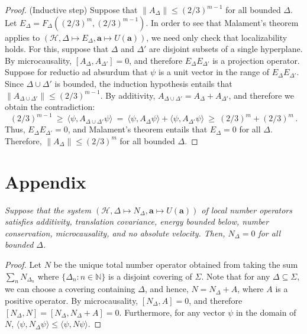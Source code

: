 \documentclass[11pt]{article}
\theoremstyle{remark}
\newcommand{\norm}[1]{\mbox{$\| #1\|$}}
\newcommand{\hil}[1]{\mathcal{#1}}
\begin{document}
\begin{appendix}
\begin{proof}
  (Inductive step) Suppose that $\norm{A_{\Delta}}\leq (2/3)^{m-1}$
  for all bounded $\Delta$.  Let $E_{\Delta}=F_{\Delta} (
  (2/3)^{m},(2/3)^{m-1})$.  In order to see that Malament's theorem
  applies to $(\hil{H},\Delta \mapsto E_{\Delta},\mathbf{a}\mapsto
  U(\mathbf{a}))$, we need only check that localizability holds.  For
  this, suppose that $\Delta$ and $\Delta '$ are disjoint subsets of a
  single hyperplane.  By microcausality, $[A_{\Delta},A_{\Delta
    '}]=0$, and therefore $E_{\Delta}E_{\Delta '}$ is a projection
  operator.  Suppose for reductio ad absurdum that $\psi$ is a unit
  vector in the range of $E_{\Delta}E_{\Delta '}$.  Since $\Delta \cup
  \Delta '$ is bounded, the induction hypothesis entails that
  $\norm{A_{\Delta \cup \Delta '}}\leq (2/3)^{m-1}$.  By additivity,
  $A_{\Delta \cup \Delta '}=A_{\Delta}+A_{\Delta '}$, and therefore we
  obtain the contradiction:
\begin{equation}
(2/3)^{m-1} \:\geq \:\langle \psi,A_{\Delta \cup \Delta '}\psi \rangle
\: = \: \langle \psi ,A_{\Delta}\psi \rangle +\langle \psi ,A_{\Delta '}\psi \rangle 
\:\geq \: (2/3)^{m}+(2/3)^{m} \,.\end{equation}
Thus, $E_{\Delta}E_{\Delta '}=0$, and Malament's
theorem entails that $E_{\Delta }=0$ for all $\Delta$.  
Therefore, $\norm{A_{\Delta}}\leq (2/3)^{m}$ for all bounded $\Delta$.  \end{proof}

\section{Appendix}
\vspace{1em}   {\it Suppose that
  the system $(\hil{H},\Delta \mapsto N_{\Delta},\mathbf{a}\mapsto
  U(\mathbf{a}))$ of local number operators satisfies additivity,
  translation covariance, energy bounded below, number conservation,
  microcausality, and no absolute velocity.  Then, $N_{\Delta }=0$ for
  all bounded $\Delta$.}

\begin{proof} Let $N$ be the unique total number operator obtained
  from taking the sum $\sum _{n}N_{\Delta _{n}}$ where $\{ \Delta
  _{n}:n\in \mathbb{N}\}$ is a disjoint covering of $\Sigma$.  Note
  that for any $\Delta \subseteq \Sigma$, we can choose a covering
  containing $\Delta$, and hence, $N=N_{\Delta}+A$, where $A$ is a
  positive operator.  By microcausality, $[N_{\Delta},A]=0$, and
  therefore $[N_{\Delta},N]=[N_{\Delta},N_{\Delta}+A]=0$.
  Furthermore, for any vector $\psi$ in the domain of $N$, $\langle
  \psi ,N_{\Delta}\psi \rangle \leq \langle \psi ,N\psi \rangle$.
  

\end{proof}
\end{appendix}
\end{document}
